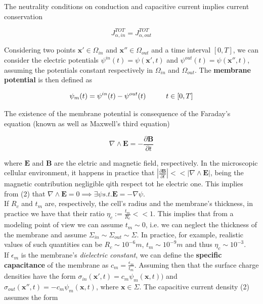 \documentclass[a4paper]{article}
\begin{document}
The neutrality conditions on conduction and capacitive current implies current conservation 

\begin{equation}
J_{\alpha,in}^{TOT} = J_{\alpha,out}^{TOT}
\end{equation}

Considering two points $ \textbf{x}' \in \Omega_{in}$ and $ \textbf{x}'' \in \Omega_{out}$ and a time interval $ [0,T]$, we can consider the electric potentials $ \psi^{in} (t) = \psi(\textbf{x}',t) $ and  $ \psi^{out} (t) = \psi(\textbf{x}'',t) $, assuming the potentials constant respectively in $\Omega_{in}$ and $\Omega_{out}$. The \textbf{membrane potential} is then defined as

\begin{equation}
\psi_m (t) = \psi^{in} (t) -  \psi^{out} (t) \hspace{1 cm}  t \in [0,T]
\end{equation}


The existence of the membrane potential is consequence of the Faraday's equation (known as well as Maxwell's third equation)

\begin{equation}
\nabla \wedge \textbf{E} = -\frac{\partial \textbf{B}}{\partial t}
\end{equation}

where $\textbf{E}$ and $\textbf{B}$ are the elctric and magnetic field, respectively. In the microscopic cellular environment, it happens in practice that $ \left| \frac{\partial \textbf{B}}{\partial t} \right| << \left| \nabla \wedge \textbf{E}\right|$, being the magnetic contribution negligible qith respect tot he electric one. This implies from (2) that $\nabla \wedge \textbf{E} = 0 \implies \exists \psi s.t. \textbf{E} = -\nabla \psi$.\\
If $R_c$ and $t_m$ are, respectively, the cell's radius and the membrane's thickness, in practice we have that their ratio $ \eta_c := \frac{t_m}{R_c} << 1$. This implies that from a modeling point of view we can assume $t_m \sim 0 $, i.e. we can neglect the thickness of the membrane and assume $\Sigma_{in} \sim \Sigma_{out} \sim \Sigma$. In practice, for example, realistic values of such quantities can be $ R_c \sim 10^{-6} m$, $ t_m \sim 10^{-9} m$ and thus $\eta_c \sim 10^{-3}$.\\
If $\epsilon_m$ is the membrane's \textit{dielectric constant}, we can define the \textbf{specific capacitance} of the membrane as $ c_m = \frac{\epsilon_m}{t_m}$. Assuming then that the surface charge densities have the form $\sigma_{in}(\textbf{x}',t) = c_m \psi_m (\textbf{x},t)) $ and  $\sigma_{out}(\textbf{x}'',t) = -c_m \psi_m (\textbf{x},t) $, where $\textbf{x} \in \Sigma$. The capacitive current density (2) assumes the form
\end{document}
